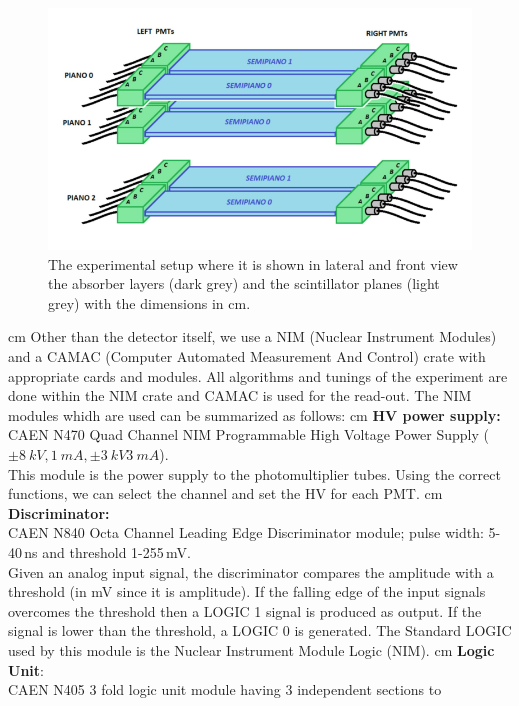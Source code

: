 	\begin{figure}
		\centering
		\includegraphics[width=1\textwidth]{figures/33.png}
		\caption{The experimental setup where it is shown in lateral and front view the absorber layers (dark grey) and the scintillator planes (light grey) with the dimensions in cm.}
		\label{fig:Setup}
	\end{figure}
	 cm
	Other than the detector itself, we use a NIM (Nuclear Instrument Modules) and a 
    CAMAC (Computer Automated Measurement And Control) crate with appropriate cards and modules.
    All algorithms and tunings of the experiment are done within the NIM crate and CAMAC is used
    for the read-out. The NIM modules whidh are used can be summarized as follows: 
	 cm
	\textbf{HV power supply:}\\ CAEN N470 Quad Channel NIM Programmable High Voltage
    Power Supply ($\pm \SI{8}{kV}, \SI{1}{mA}, \pm \SI{3}{kV}  \SI{3}{mA}$).\\
	This module is the power supply to the photomultiplier tubes. Using the correct functions,
    we can select the channel and set the HV for each PMT.
	 cm
	\textbf{Discriminator:}\\ CAEN N840 Octa Channel Leading Edge Discriminator module; pulse width:
    5-40\,ns and threshold 1-255\,mV.\\
	Given an analog input signal, the discriminator compares the amplitude with a threshold 
    (in mV since it is amplitude). If the falling edge of the input signals overcomes the threshold
    then a LOGIC 1 signal is produced as output. If the signal is lower than the threshold,
    a LOGIC 0 is generated. The Standard LOGIC used by this module is the Nuclear Instrument
    Module Logic (NIM).
	 cm
	\textbf{Logic Unit}:\\ CAEN N405 3 fold logic unit module having 3 independent sections to
